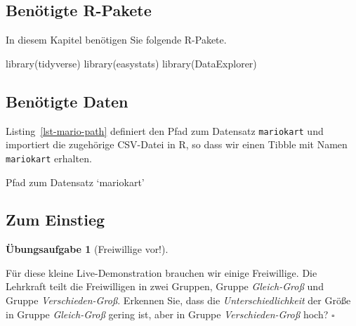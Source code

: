 \documentclass[
  a4paper,
]{scrbook}
\newenvironment{Shaded}{\begin{snugshade}}{\end{snugshade}}
\newcommand{\FunctionTok}[1]{\textcolor[rgb]{0.28,0.35,0.67}{#1}}
\newcommand{\NormalTok}[1]{\textcolor[rgb]{0.00,0.23,0.31}{#1}}
\newcommand{\OtherTok}[1]{\textcolor[rgb]{0.00,0.23,0.31}{#1}}
\newcommand{\StringTok}[1]{\textcolor[rgb]{0.13,0.47,0.30}{#1}}
\theoremstyle{definition}
\theoremstyle{definition}
\theoremstyle{definition}
\newtheorem{exercise}{Übungsaufgabe}[chapter]
\theoremstyle{remark}
\begin{document}
\subsection{Benötigte R-Pakete}\label{benuxf6tigte-r-pakete-3}

In diesem Kapitel benötigen Sie folgende R-Pakete.

\begin{Shaded}
\begin{Highlighting}[]
\FunctionTok{library}\NormalTok{(tidyverse)}
\FunctionTok{library}\NormalTok{(easystats)}
\FunctionTok{library}\NormalTok{(DataExplorer)}
\end{Highlighting}
\end{Shaded}

\subsection{Benötigte Daten}\label{benuxf6tigte-daten-4}

Listing~\ref{lst-mario-path} definiert den Pfad zum Datensatz
\texttt{mariokart} und importiert die zugehörige CSV-Datei in R, so dass
wir einen Tibble mit Namen \texttt{mariokart} erhalten.

\begin{codelisting}

\caption{\label{lst-mario-path}Pfad zum Datensatz `mariokart'}

\centering{

\begin{Shaded}
\begin{Highlighting}[]
\NormalTok{mariokart\_path }\OtherTok{\textless{}{-}} \FunctionTok{paste0}\NormalTok{(}
  \StringTok{"https://vincentarelbundock.github.io/Rdatasets/"}\NormalTok{,}
  \StringTok{"csv/openintro/mariokart.csv"}\NormalTok{)}

\NormalTok{mariokart }\OtherTok{\textless{}{-}} \FunctionTok{read.csv}\NormalTok{(mariokart\_path)}
\end{Highlighting}
\end{Shaded}

}

\end{codelisting}%

\subsection{Zum Einstieg}\label{zum-einstieg-1}

\begin{exercise}[Freiwillige
vor!]\protect\hypertarget{exr-streuung-erkennen}{}\label{exr-streuung-erkennen}

Für diese kleine Live-Demonstration brauchen wir einige Freiwillige. Die
Lehrkraft teilt die Freiwilligen in zwei Gruppen, Gruppe
\emph{Gleich-Groß} und Gruppe \emph{Verschieden-Groß}. Erkennen Sie,
dass die \emph{Unterschiedlichkeit} der Größe in Gruppe
\emph{Gleich-Groß} gering ist, aber in Gruppe \emph{Verschieden-Groß}
hoch? \(\square\)

\end{exercise}
\end{document}
